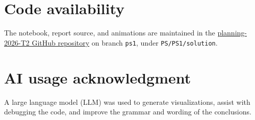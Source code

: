 \documentclass[11pt,a4paper]{article}
\begin{document}
\section*{Code availability}
The notebook, report source, and animations are maintained in the
\href{https://github.com/glebuben/planning-2026-T2}{planning-2026-T2 GitHub repository}
on branch \texttt{ps1}, under \texttt{PS/PS1/solution}.

\section*{AI usage acknowledgment}
A large language model (LLM) was used to generate visualizations, assist
with debugging the code, and improve the grammar and wording of the conclusions.

\clearpage
{}
{}

\end{document}
